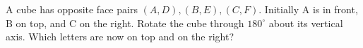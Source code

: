 A cube has opposite face pairs $(A,D),(B,E),(C,F)$. Initially A is in front, B on top, and C on the right. Rotate the cube through $180^\circ$ about its vertical axis. Which letters are now on top and on the right?
